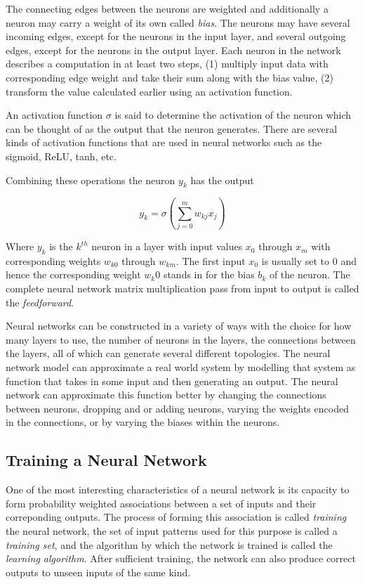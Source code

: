 The connecting edges between the neurons are weighted and additionally a neuron may carry a weight of its own called \textit{bias}. The neurons may have several incoming edges, except for the neurons in the input layer, and several outgoing edges, except for the neurons in the output layer. Each neuron in the network describes a computation in at least two steps, (1) multiply input data with corresponding edge weight and take their sum along with the bias value, (2) transform the value calculated earlier using an activation function.

An activation function $\sigma$ is said to determine the activation of the neuron which can be thought of as the output that the neuron generates. There are several kinds of activation functions that are used in neural networks such as the sigmoid, ReLU, tanh, etc.

Combining these operations the neuron $y_k$ has the output

\begin{equation}
	y_k = \sigma \left( \sum_{j=0}^m w_{kj} x_j \right)
\end{equation}

Where $y_k$ is the $k^{th}$ neuron in a layer with input values $x_0$ through $x_m$ with corresponding weights $w_{k0}$ through $w_{km}$. The first input $x_0$ is usually set to $0$ and hence the corresponding weight $w_k0$ stands in for the bias $b_k$ of the neuron. The complete neural network matrix multiplication pass from input to output is called the \textit{feedforward}.

Neural networks can be constructed in a variety of ways with the choice for how many layers to use, the number of neurons in the layers, the connections between the layers, all of which can generate several different topologies. The neural network model can approximate a real world system by modelling that system as function that takes in some input and then generating an output. The neural network can approximate this function better by changing the connections between neurons, dropping and or adding neurons, varying the weights encoded in the connections, or by varying the biases within the neurons.

\subsection{Training a Neural Network}

One of the most interesting characteristics of a neural network is its capacity to form probability weighted associations between a set of inputs and their correponding outputs. The process of forming this association is called \textit{training} the neural network, the set of input patterns used for this purpose is called a \textit{training set}, and the algorithm by which the network is trained is called the \textit{learning algorithm}. After sufficient training, the network can also produce correct outputs to unseen inputs of the same kind.

